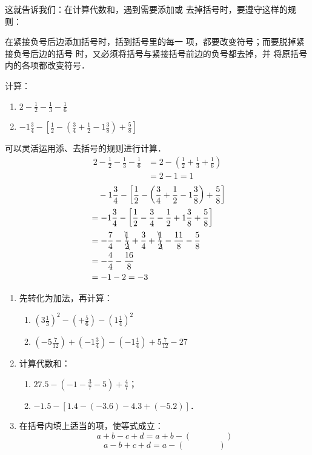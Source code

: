 这就告诉我们：在计算代数和，遇到需要添加或
去掉括号时，要遵守这样的规则：

\begin{blk}{}
   在紧接负号后边添加括号时，括到括号里的每一
项，都要改变符号；而要脱掉紧接负号后边的括号
时，又必须将括号与紧接括号前边的负号都去掉，并
将原括号内的各项都改变符号．
\end{blk}
   


\begin{example}
    计算：
\begin{enumerate}
    \item $2-\frac{1}{2}-\frac{1}{3}-\frac{1}{6}$
    \item $-1\frac{3}{4}-\left[\frac{1}{2}-\left(\frac{3}{4}+\frac{1}{2}-1\frac{3}{8}\right)+\frac{5}{8}\right]$
\end{enumerate}
\end{example}

\begin{solution}
    可以灵活运用添、去括号的规则进行计算．
\[ \begin{split}
    2-\frac{1}{2}-\frac{1}{3}-\frac{1}{6}&=2-\left(\frac{1}{2}+\frac{1}{3}+\frac{1}{6}\right)\\
    &=2-1=1
\end{split}  \]
\[ \begin{split}
    &\quad -1\frac{3}{4}-\left[\frac{1}{2}-\left(\frac{3}{4}+\frac{1}{2}-1\frac{3}{8}\right)+\frac{5}{8}\right]\\
    &=-1\frac{3}{4}-\left[\frac{1}{2}-\frac{3}{4}-\frac{1}{2}+1\frac{3}{8}+\frac{5}{8}\right]\\
    &=-\frac{7}{4}-\bcancel{\frac{1}{2}}+\frac{3}{4}+\bcancel{\frac{1}{2}}-\frac{11}{8}-\frac{5}{8}\\
    &=-\frac{4}{4}-\frac{16}{8}\\
    &=-1-2=-3
\end{split}  \]
\end{solution}

\begin{ex}
\begin{enumerate}
    \item 先转化为加法，再计算：
    \begin{enumerate}
        \item $\left(3\frac{1}{3}\right)^2-\left(+\frac{5}{6}\right)-\left(1\frac{1}{4}\right)^2$
        \item $\left(-5\frac{7}{12}\right)+\left(-1\frac{3}{4}\right)-\left(-1\frac{1}{4}\right)+5\frac{7}{12}-27$
    \end{enumerate}
    \item 计算代数和：
    \begin{enumerate}
        \item $27.5-\left(-1-\frac{3}{7}-5\right)+\frac{4}{7}$；
        \item $-1.5-[1.4-(-3.6)-4.3+(-5.2)]$．
    \end{enumerate}
    \item 在括号内填上适当的项，使等式成立：
    \[a+b-c+d=a+b-(\qquad \qquad )\]
       \[ a-b+c+d=a-(\qquad \qquad )     \]
\end{enumerate}    
\end{ex}

